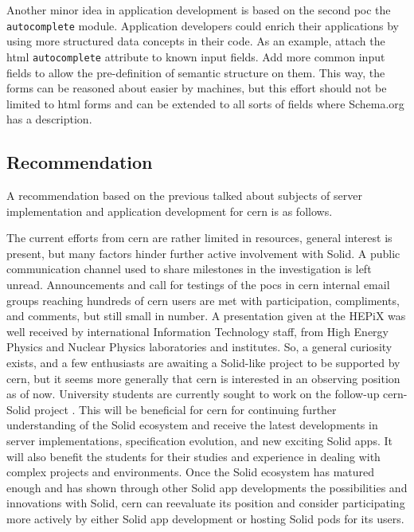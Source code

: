 Another minor idea in application development is based on the second \gls{poc} the \texttt{autocomplete} module.  Application developers could enrich their applications by using more structured data concepts in their code. As an example, attach the \gls{html} \texttt{autocomplete} attribute to known input fields. Add more common input fields to allow the pre-definition of semantic structure on them. This way, the forms can be reasoned about easier by machines, but this effort should not be limited to \gls{html} forms and can be extended to all sorts of fields where Schema.org has a description.

\subsection{Recommendation}

A recommendation based on the previous talked about subjects of server implementation and application development for \gls{cern} is as follows.

The current efforts from \gls{cern} are rather limited in resources, general interest is present, but many factors hinder further active involvement with Solid. A public communication channel used to share milestones in the investigation is left unread. Announcements and call for testings of the \glspl{poc} in \gls{cern} internal email groups reaching hundreds of \gls{cern} users are met with participation, compliments, and comments, but still small in number. A presentation given at the HEPiX \cite{hepix} was well received by international Information Technology staff, from High Energy Physics and Nuclear Physics laboratories and institutes. So, a general curiosity exists, and a few enthusiasts are awaiting a Solid-like project to be supported by \gls{cern}, but it seems more generally that \gls{cern} is interested in an observing position as of now. University students are currently sought to work on the follow-up \gls{cern}-Solid project \cite{cern-slides}. This will be beneficial for \gls{cern} for continuing further understanding of the Solid ecosystem and receive the latest developments in server implementations, specification evolution, and new exciting Solid apps. It will also benefit the students for their studies and experience in dealing with complex projects and environments. Once the Solid ecosystem has matured enough and has shown through other Solid app developments the possibilities and innovations with Solid, \gls{cern} can reevaluate its position and consider participating more actively by either Solid app development or hosting Solid pods for its users.
